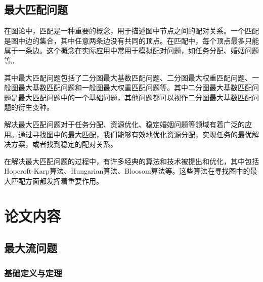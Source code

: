 \documentclass[UTF8]{ctexart}
\begin{document}
\subsection{最大匹配问题}

在图论中，匹配是一种重要的概念，用于描述图中节点之间的配对关系。一个匹配是图中边的集合，其中任意两条边没有共同的顶点。在匹配中，每个顶点最多只能属于一条边。这个概念在实际应用中常用于模拟配对问题，如任务分配、婚姻问题等。

其中最大匹配问题包括了二分图最大基数匹配问题、二分图最大权重匹配问题、一般图最大基数匹配问题和一般图最大权重匹配问题等。其中二分图最大基数匹配问题是最大匹配问题中的一个基础问题，其他问题都可以视作二分图最大基数匹配问题的衍生变种。

解决最大匹配问题对于任务分配、资源优化、稳定婚姻问题等领域有着广泛的应用。通过寻找图中的最大匹配，我们能够有效地优化资源分配，实现任务的最优解决方案，或者找到稳定的配对关系。

在解决最大匹配问题的过程中，有许多经典的算法和技术被提出和优化，其中包括Hopcroft-Karp算法\cite{hopcroft1973n}、Hungarian算法\cite{munkres1957algorithms}、Bloosom算法\cite{edmonds1965paths}等。这些算法在寻找图中的最大匹配方面都发挥着重要作用。



\section{论文内容}


\subsection{最大流问题}

\subsubsection{基础定义与定理}
\end{document}
